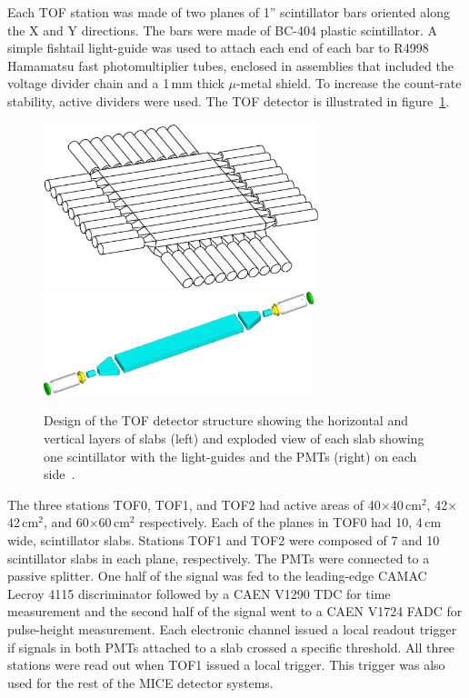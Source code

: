 Each TOF station was made of two planes of 1'' scintillator bars oriented along the X and Y directions.
The bars were made of BC-404 plastic scintillator. A simple fishtail light-guide was used to attach each end of each bar to R4998 Hamamatsu fast photomultiplier tubes,
enclosed in assemblies that included the voltage divider chain and a 1\,mm thick $\mu$-metal shield. To increase the count-rate stability, active
dividers were used. The TOF detector is illustrated in figure~\ref{fig:tof:schematic}.


\begin{figure}[!htb]
  \centering
  \includegraphics[width=8cm]{tof_diagram2}
  \includegraphics[height=3cm]{slab_design2}
  \caption{Design of the TOF detector structure showing the horizontal and vertical layers of slabs (left) and exploded view of each slab showing one scintillator with the light-guides and the PMTs (right) on each side~\cite{NOTE145}.}
  \label{fig:tof:schematic}
\end{figure}

The three stations TOF0, TOF1, and TOF2 had active areas of
40$\times$40\,cm$^2$, 42$\times$42\,cm$^2$, and 60$\times$60\,cm$^2$
respectively.  Each of the planes in TOF0 had 10, 4\,cm wide, scintillator slabs.
Stations TOF1 and TOF2 were composed of 7 and 10 scintillator slabs in each plane, respectively.
The PMTs were connected to a passive splitter.
One half of the signal was fed to the leading-edge CAMAC Lecroy 4115 discriminator followed by a CAEN
V1290 TDC for time measurement and the second half of the signal went to a CAEN V1724 FADC for pulse-height measurement.
Each electronic channel issued a local readout trigger if signals in both PMTs attached to a
slab crossed a specific threshold. All three stations were read out when TOF1 issued a local trigger.
This trigger was also used for the rest of the MICE detector systems.

